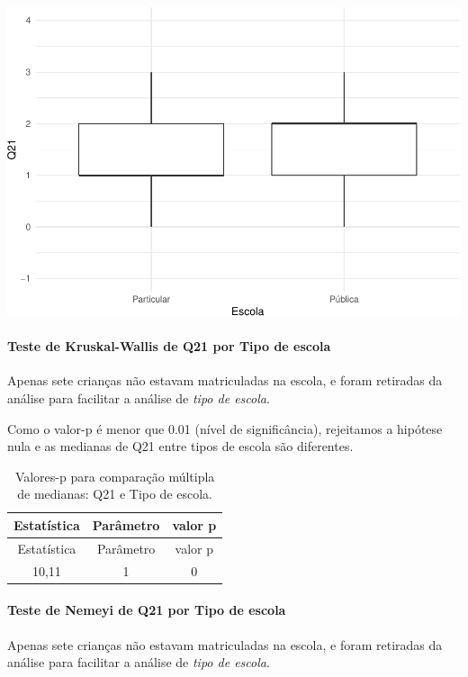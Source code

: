 \documentclass[]{article}
\let\oldparagraph\paragraph
\renewcommand{\paragraph}[1]{\oldparagraph{#1}\mbox{}}
\begin{document}
\begin{center}\includegraphics[width=0.75\linewidth]{relatorio_covid19_files/figure-latex/unnamed-chunk-470-1} \end{center}

\hypertarget{teste-de-kruskal-wallis-de-q21-por-tipo-de-escola}{%
\paragraph{Teste de Kruskal-Wallis de Q21 por Tipo de escola}\label{teste-de-kruskal-wallis-de-q21-por-tipo-de-escola}}

Apenas sete crianças não estavam matriculadas na escola, e foram retiradas da análise para facilitar a análise de \emph{tipo de escola}.

Como o valor-p é menor que 0.01 (nível de significância), rejeitamos a hipótese nula e as medianas de Q21 entre tipos de escola são diferentes.

\begin{longtable}[]{@{}ccc@{}}
\caption{\label{tab:unnamed-chunk-472}Valores-p para comparação múltipla de medianas: Q21 e Tipo de escola.}\tabularnewline
\toprule
Estatística & Parâmetro & valor p\tabularnewline
\midrule
\endfirsthead
\toprule
Estatística & Parâmetro & valor p\tabularnewline
\midrule
\endhead
10,11 & 1 & 0\tabularnewline
\bottomrule
\end{longtable}

\hypertarget{teste-de-nemeyi-de-q21-por-tipo-de-escola}{%
\paragraph{Teste de Nemeyi de Q21 por Tipo de escola}\label{teste-de-nemeyi-de-q21-por-tipo-de-escola}}

Apenas sete crianças não estavam matriculadas na escola, e foram retiradas da análise para facilitar a análise de \emph{tipo de escola}.
\end{document}
